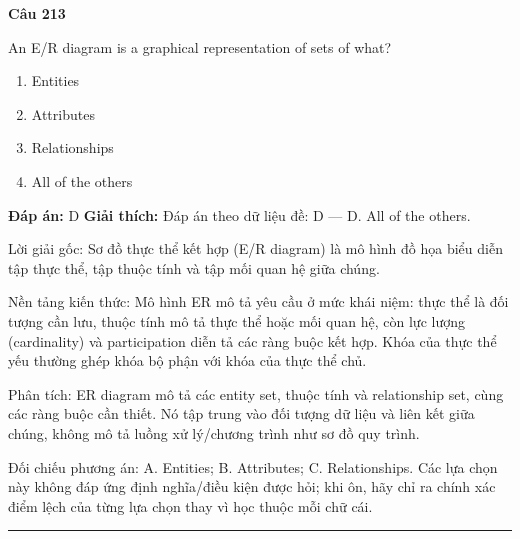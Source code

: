 \documentclass[11pt,a4paper]{article}
\newenvironment{question}[1]{%
  \par\vspace{1em}\noindent\textbf{\large Câu #1}\par\vspace{0.4em}
}{%
  \par\vspace{1em}\hrule\vspace{0.6em}
}
\newenvironment{choices}{%
  \begin{enumerate}[label=\textbf{\Alph*.},leftmargin=2.2em,itemsep=2pt,topsep=3pt]
}{%
  \end{enumerate}
}
\newcommand{\choice}{\item}
\begin{document}
\begin{question}{213}
An E/R diagram is a graphical representation of sets of what?
\begin{choices}
\choice Entities
\choice Attributes
\choice Relationships
\choice All of the others
\end{choices}
\textbf{Đáp án:} D
\textbf{Giải thích:} Đáp án theo dữ liệu đề: D — D. All of the others.

Lời giải gốc: Sơ đồ thực thể kết hợp (E/R diagram) là mô hình đồ họa biểu diễn tập thực thể, tập thuộc tính và tập mối quan hệ giữa chúng.

Nền tảng kiến thức: Mô hình ER mô tả yêu cầu ở mức khái niệm: thực thể là đối tượng cần lưu, thuộc tính mô tả thực thể hoặc mối quan hệ, còn lực lượng (cardinality) và participation diễn tả các ràng buộc kết hợp. Khóa của thực thể yếu thường ghép khóa bộ phận với khóa của thực thể chủ.

Phân tích: ER diagram mô tả các entity set, thuộc tính và relationship set, cùng các ràng buộc cần thiết. Nó tập trung vào đối tượng dữ liệu và liên kết giữa chúng, không mô tả luồng xử lý/chương trình như sơ đồ quy trình.

Đối chiếu phương án: A. Entities; B. Attributes; C. Relationships. Các lựa chọn này không đáp ứng định nghĩa/điều kiện được hỏi; khi ôn, hãy chỉ ra chính xác điểm lệch của từng lựa chọn thay vì học thuộc mỗi chữ cái.
\end{question}
\end{document}
